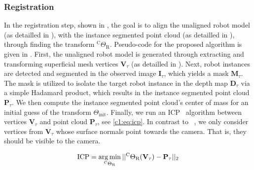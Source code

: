 \subsubsection{Registration}
\label{c1:sec:registration}
In the registration step, shown in , the goal is to align the unaligned robot model (as detailled in ), with the instance segmented point cloud (as detailled in ), through finding the transform $^\text{C}\Theta_\text{R}$. Pseudo-code for the proposed algorithm is given in .
First, the unaligned robot model is generated through extracting and transforming superficial mesh vertices $\mathbf{V}_\tau$ (as detailled in ).
Next, robot instances are detected and segmented in the observed image $\mathbf{I}_\tau$, which yields a mask $\mathbf{M}_\tau$.
The mask is utilized to isolate the target robot instance in the depth map $\mathbf{D}_\tau$ via a simple Hadamard product, which results in the instance segmented point cloud $\mathbf{P}_\tau$.
We then compute the instance segmented point cloud's center of mass for an initial guess of the transform $\Theta_\text{init}$. Finally, we run an ICP~\citep{simple_icp} algorithm between vertices $\mathbf{V}_\tau$ and point cloud $\mathbf{P}_\tau$, see \eqref{c1:eq:icp}. In contrast to ~\citep{simple_icp}, we only consider vertices from $\mathbf{V}_\tau$ whose surface normals point towards the camera. That is, they should be visible to the camera.

\begin{equation}
    \label{c1:eq:icp}
    \text{ICP} = \argmin_{^\text{C}\Theta_\text{R}} || ^\text{C}\Theta_\text{R}(\mathbf{V}_\tau) - \mathbf{P}_\tau||_2
\end{equation}



